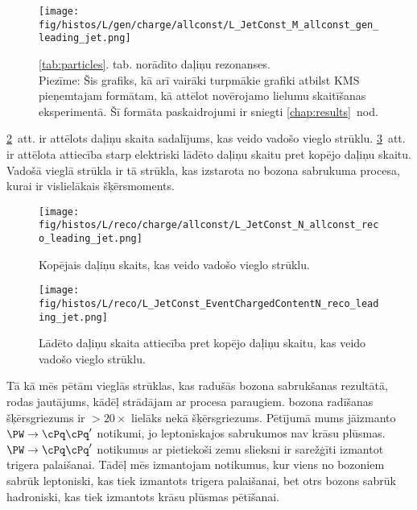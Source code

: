   \begin{figure}[hbtp]
    \centering
     \def\twidth{0.45}
    \texttt{[image: fig/histos/L/gen/charge/allconst/L\_JetConst\_M\_allconst\_gen\_leading\_jet.png]}
    \caption{\protect\ref{tab:particles}. tab. norādīto daļiņu rezonanses. \\
    \footnotesize Piezīme: Šis grafiks, kā arī vairāki turpmākie grafiki atbilst KMS pieņemtajam formātam, kā attēlot novērojamo lielumu skaitīšanas eksperimentā. Šī formāta paskaidrojumi ir sniegti \protect\ref{chap:results}~nod.}
    \label{fig:mass_resonances}
  \end{figure}

\ref{fig:number}~att. ir attēlots daļiņu skaita sadalījums, kas veido vadošo vieglo strūklu. \ref{fig:charged_content}~att. ir attēlota attiecība starp elektriski lādēto daļiņu skaitu pret kopējo daļiņu skaitu. Vadošā vieglā strūkla ir tā strūkla, kas izstarota no \PW bozona sabrukuma procesa, kurai ir vislielākais šķērsmoments.

  \begin{figure}[hbtp]
    \centering
     \def\twidth{0.45}
    \texttt{[image: fig/histos/L/reco/charge/allconst/L\_JetConst\_N\_allconst\_reco\_leading\_jet.png]}
    \caption{Kopējais daļiņu skaits, kas veido vadošo vieglo strūklu.}
    \label{fig:number}

\end{figure}
     \begin{figure}[hbtp]
     \centering
     \def\twidth{0.45}
     \texttt{[image: fig/histos/L/reco/L\_JetConst\_EventChargedContentN\_reco\_leading\_jet.png]}
     \caption{Lādēto daļiņu skaita attiecība pret kopējo daļiņu skaitu, kas veido vadošo vieglo strūklu.}
  \label{fig:charged_content}
   \end{figure}

Tā kā mēs pētām vieglās strūklas, kas radušās \PW bozona sabrukšanas rezultātā, rodas jautājums, kādēļ strādājam ar \ttbar procesa paraugiem. \PW bozona radīšanas šķērsgriezums ir $>20\times$ lielāks nekā \ttbar šķērsgriezums. Pētījumā mums jāizmanto $\PW\rightarrow\cPq\cPq'$ notikumi, jo leptoniskajos sabrukumos nav krāsu plūsmas. $\PW\rightarrow\cPq\cPq'$ notikumus ar pietiekoši zemu \pt slieksni ir sarežģīti izmantot trigera palaišanai. Tādēļ mēs izmantojam \ttbar notikumus, kur viens no \PW bozoniem sabrūk leptoniski, kas tiek izmantots trigera palaišanai, bet otrs \PW bozons sabrūk hadroniski, kas tiek izmantots krāsu plūsmas pētīšanai.

